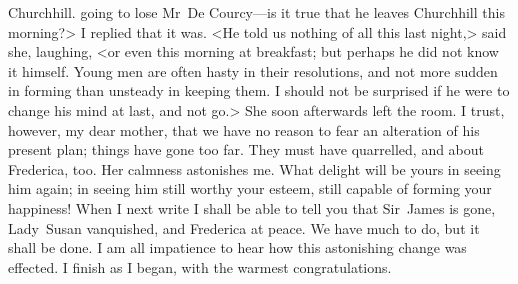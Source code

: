\begin{mail}{Churchhill.}{}
going to lose Mr~De Courcy—is it true that he leaves Churchhill this morning?> I replied that it was. <He told us nothing of all this last night,> said she, laughing, <or even this morning at breakfast; but perhaps he did not know it himself. Young men are often hasty in their resolutions, and not more sudden in forming than unsteady in keeping them. I should not be surprised if he were to change his mind at last, and not go.> She soon afterwards left the room. I trust, however, my dear mother, that we have no reason to fear an alteration of his present plan; things have gone too far. They must have quarrelled, and about Frederica, too. Her calmness astonishes me. What delight will be yours in seeing him again; in seeing him still worthy your esteem, still capable of forming your happiness! When I next write I shall be able to tell you that Sir~James is gone, Lady~Susan vanquished, and Frederica at peace. We have much to do, but it shall be done. I am all impatience to hear how this astonishing change was effected. I finish as I began, with the warmest congratulations. 

\end{mail}